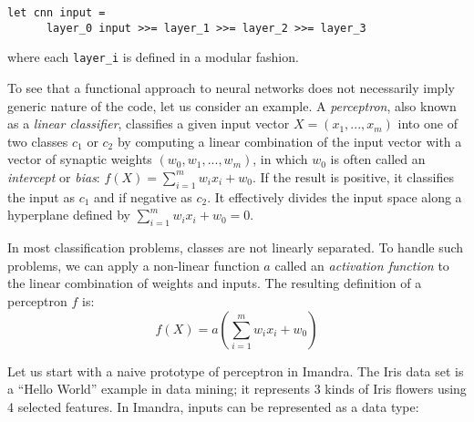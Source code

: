 \documentclass[runningheads]{llncs}
\begin{document}
\begin{lstlisting}[label={lst:model}]
  let cnn input =
      layer_0 input >>= layer_1 >>= layer_2 >>= layer_3
\end{lstlisting}

where each \lstinline?layer_i? is defined in a modular fashion. 


 To see that a functional approach to neural networks does not necessarily imply generic nature of the code, 
let us consider an example. 
A \emph{perceptron}, also known as a \emph{linear classifier}, classifies a given input vector $X = (x_1, ..., x_m)$ into one of two classes $c_1$ or $c_2$ by computing a linear combination of the input vector with a vector of synaptic weights $(w_0, w_1, ..., w_m)$, in which $w_0$ is often called an \emph{intercept} or \emph{bias}: 
	$ f(X) = 	\sum_{i=1}^{m}w_ix_i + w_0 $.
If the result is positive, it classifies the input as $c_1$ and if negative as $c_2$. It effectively divides the input space along a hyperplane defined by
$\sum_{i=1}^{m}w_ix_i + w_0 = 0$. 



In most classification problems, classes are not linearly separated. To handle such problems, we can apply a non-linear function $a$ called an \textit{activation function} to the linear combination of weights and inputs. The resulting definition of a perceptron $f$ is:
\begin{equation}\label{eq:perceptron}
	f(X) = a\left(\sum_{i=1}^{m}w_ix_i + w_0\right)
      \end{equation}

     Let us start with a naive prototype of perceptron in Imandra.  The Iris data set is a ``Hello World'' example in data mining; it represents 3 kinds of Iris flowers using 4 selected features.
      In Imandra, inputs can be represented as a data type: %
\end{document}
